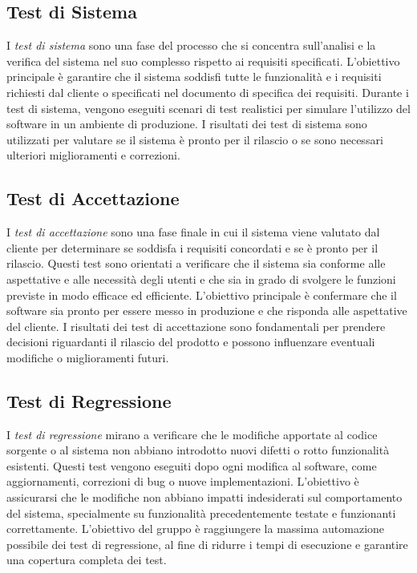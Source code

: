 \documentclass{article}
\begin{document}
{\subsection{Test di Sistema}
I \textit{test di sistema} sono una fase del processo che si concentra sull'analisi e la verifica del sistema nel suo complesso rispetto ai requisiti specificati. L'obiettivo principale è garantire che il sistema soddisfi tutte le funzionalità e i requisiti richiesti dal cliente o specificati nel documento di specifica dei requisiti. Durante i test di sistema, vengono eseguiti scenari di test realistici per simulare l'utilizzo del software in un ambiente di produzione. I risultati dei test di sistema sono utilizzati per valutare se il sistema è pronto per il rilascio o se sono necessari ulteriori miglioramenti e correzioni.

\subsection{Test di Accettazione}
I \textit{test di accettazione} sono una fase finale in cui il sistema viene valutato dal cliente per determinare se soddisfa i requisiti concordati e se è pronto per il rilascio. Questi test sono orientati a verificare che il sistema sia conforme alle aspettative e alle necessità degli utenti e che sia in grado di svolgere le funzioni previste in modo efficace ed efficiente. L'obiettivo principale è confermare che il software sia pronto per essere messo in produzione e che risponda alle aspettative del cliente. I risultati dei test di accettazione sono fondamentali per prendere decisioni riguardanti il rilascio del prodotto e possono influenzare eventuali modifiche o miglioramenti futuri.

\subsection{Test di Regressione}
I \textit{test di regressione} mirano a verificare che le modifiche apportate al codice sorgente o al sistema non abbiano introdotto nuovi difetti o rotto funzionalità esistenti. Questi test vengono eseguiti dopo ogni modifica al software, come aggiornamenti, correzioni di bug o nuove implementazioni. L'obiettivo è assicurarsi che le modifiche non abbiano impatti indesiderati sul comportamento del sistema, specialmente su funzionalità precedentemente testate e funzionanti correttamente. L'obiettivo del gruppo è raggiungere la massima automazione possibile dei test di regressione, al fine di ridurre i tempi di esecuzione e garantire una copertura completa dei test.

}
\end{document}
